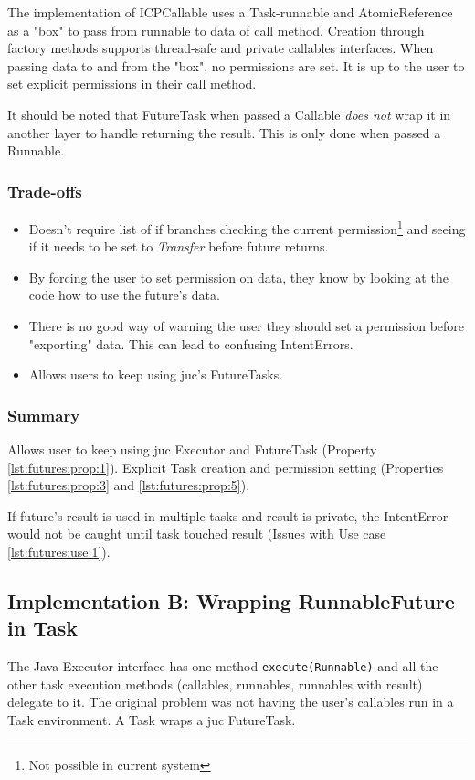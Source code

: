 The implementation of ICPCallable uses a Task-runnable and AtomicReference as a "box" to pass from runnable to
data of call method. Creation through factory methods supports thread-safe and private callables
interfaces. When passing data to and from the "box", no permissions are set. It is up to the user
to set explicit permissions in their call method.

It should be noted that FutureTask when passed a Callable \textit{does not} wrap it in another layer to handle
returning the result. This is only done when passed a Runnable.

\subsubsection*{Trade-offs}
\begin{itemize}
    \item Doesn't require list of if branches checking the current permission\footnote{Not possible in current system}
    and seeing if it needs to be set to \textit{Transfer} before future returns.
    \item By forcing the user to set permission on data, they know by looking at the code how to use
    the future's data.
    \item There is no good way of warning the user they should set a permission before "exporting" data.
    This can lead to confusing IntentErrors.
    \item Allows users to keep using \gls{juc}'s FutureTasks.
\end{itemize}

\subsubsection*{Summary}
Allows user to keep using \gls{juc} Executor and FutureTask (Property \ref{lst:futures:prop:1}). Explicit
Task creation and permission setting (Properties \ref{lst:futures:prop:3} and \ref{lst:futures:prop:5}).

If future's result is used in multiple tasks and result is private, the IntentError would not be caught until
task touched result (Issues with Use case \ref{lst:futures:use:1}).

\subsection{Implementation B: Wrapping RunnableFuture in Task} \label{sec:futures:sub:implementation:2}
The Java Executor interface has one method \lstinline{execute(Runnable)} and all the other task execution
methods (callables, runnables, runnables with result) delegate to it. The original problem was not having the user's
callables run in a Task environment. A Task wraps a \gls{juc} FutureTask.

